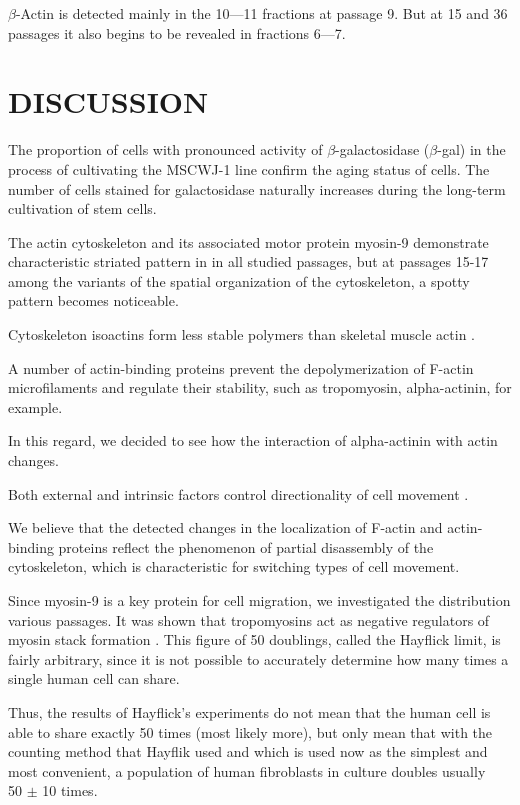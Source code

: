 \documentclass[alpha-refs]{wiley-article}
\begin{document}
$\beta$-Actin is detected mainly in the 10---11 fractions at passage 9.
But at 15 and 36 passages it also begins to be revealed in fractions 6---7.

\section{DISCUSSION}

The proportion of cells with pronounced activity of $\beta$-galactosidase ($\beta$-gal) in the process of cultivating the MSCWJ-1 line confirm the aging status of cells.
The number of cells stained for galactosidase naturally increases during the long-term cultivation of stem cells.


The actin cytoskeleton and its associated motor protein myosin-9 demonstrate characteristic striated pattern in in all studied passages, but at passages 15-17 among the variants of the spatial organization of the cytoskeleton, a spotty pattern becomes noticeable.

Cytoskeleton isoactins form less stable polymers than skeletal muscle actin \cite{khaitlina2001functional}.

A number of actin-binding proteins prevent the depolymerization of F-actin microfilaments and regulate their stability, such as tropomyosin, alpha-actinin, for example.

In this regard, we decided to see how the interaction of alpha-actinin with actin changes.


Both external and intrinsic factors control directionality of cell movement \cite{tiurin2013molecular}.

We believe that the detected changes in the localization of F-actin and actin-binding proteins reflect the phenomenon of partial disassembly of the cytoskeleton, which is characteristic for switching types of cell movement.

Since myosin-9 is a key protein for cell migration, we investigated the distribution various passages.
It was shown that tropomyosins act as negative regulators of myosin stack formation \cite{hu2019reciprocal}.
This figure of 50 doublings, called the Hayflick limit, is fairly arbitrary, since it is not possible to accurately determine how many times a single human cell can share.

Thus, the results of Hayflick's experiments do not mean that the human cell is able to share exactly 50 times (most likely more), but only mean that with the counting method that Hayflik used and which is used now as the simplest and most convenient, a population of human fibroblasts in culture doubles usually ~ 50 $\pm$ 10 times.
\end{document}
